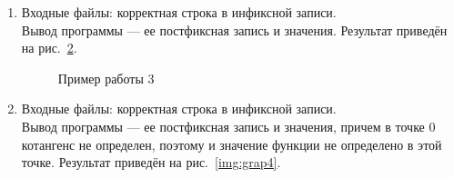\documentclass[12pt, a4paper]{article}
\begin{document}
\begin{enumerate}
\begin{figure}[h]
  		\caption{Пример работы 2}
  		\label{img:grap2}
	\end{figure}
	\newpage
	\item Входные файлы: корректная строка в инфиксной записи.\\
	Вывод программы --- ее постфиксная запись и значения.
	Результат приведён на рис.~\ref{img:grap3}.
	\begin{figure}[h]
  		\caption{Пример работы 3}
  		\label{img:grap3}
	\end{figure}
	\item Входные файлы: корректная строка в инфиксной записи.\\
	Вывод программы --- ее постфиксная запись и значения, причем в 
	точке 0 котангенс не определен, поэтому и значение функции не 
	определено в этой точке. Результат приведён на рис.~\ref{img:grap4}.
	\begin{figure}[h]

\end{figure}
\end{enumerate}
\end{document}
